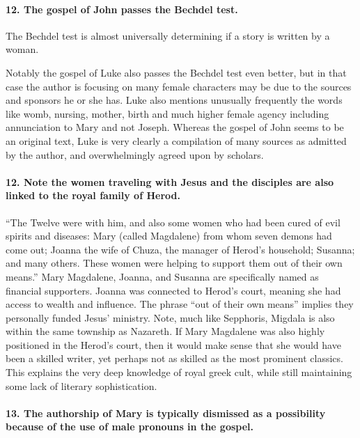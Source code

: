 \paragraph{12.
The gospel of John passes the Bechdel test.}\label{par:the-gospel-of-john-passes-the-bechdel-test.}

The Bechdel test is almost universally determining if a story is written by a woman.

Notably the gospel of Luke also passes the Bechdel test even better, but in that case the author is focusing on many female characters may be due to the sources and sponsors he or she has.
Luke also mentions unusually frequently the words like womb, nursing, mother, birth and much higher female agency including annunciation to Mary and not Joseph.
Whereas the gospel of John seems to be an original text, Luke is very clearly a compilation of many sources as admitted by the author, and overwhelmingly agreed upon by scholars.

\paragraph{12.
Note the women traveling with Jesus and the disciples are also linked to the royal family of Herod.}\label{par:note-the-women-traveling-with-jesus-and-the-disciples-are-also-linked-to-the-royal-family-of-herod.}

``The Twelve were with him, and also some women who had been cured of evil spirits and diseases: Mary (called Magdalene) from whom seven demons had come out; Joanna the wife of Chuza, the manager of Herod's household; Susanna; and many others.
These women were helping to support them out of their own means.'' Mary Magdalene, Joanna, and Susanna are specifically named as financial supporters.
Joanna was connected to Herod's court, meaning she had access to wealth and influence.
The phrase ``out of their own means'' implies they personally funded Jesus' ministry.
Note, much like Sepphoris, Migdala is also within the same township as Nazareth.
If Mary Magdalene was also highly positioned in the Herod's court, then it would make sense that she would have been a skilled writer, yet perhaps not as skilled as the most prominent classics.
This explains the very deep knowledge of royal greek cult, while still maintaining some lack of literary sophistication.

\paragraph{13.
The authorship of Mary is typically dismissed as a possibility because of the use of male pronouns in the gospel.}\label{par:the-authorship-of-mary-is-typically-dismissed-as-a-possibility-because-of-the-use-of-male-pronouns-in-the-gospel.}

